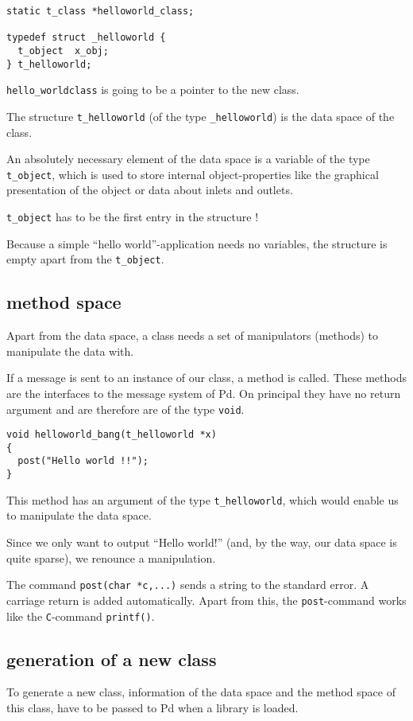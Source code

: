 \documentclass[12pt, a4paper,english,titlepage]{article}
\begin{document}
\begin{verbatim}
static t_class *helloworld_class;

typedef struct _helloworld {
  t_object  x_obj;
} t_helloworld;
\end{verbatim}

\verb+hello_worldclass+ is going to be a pointer to the new class.

The structure \verb+t_helloworld+ (of the type \verb+_helloworld+) is
the data space of the class.

An absolutely necessary element of the data space is a variable of the type
\verb+t_object+, which is used to store internal object-properties like
the graphical presentation of the object or data about inlets and outlets.

\verb+t_object+ has to be the first entry in the structure !

Because a simple ``hello world''-application needs no variables,
the structure is empty apart from the \verb+t_object+.


\subsection{method space}
Apart from the data space, a class needs a set of manipulators (methods) to
manipulate the data with.

If a message is sent to an instance of our class, a method is called.
These methods are the interfaces to the message system of Pd.
On principal they have no return argument and are therefore are of the
type \verb+void+.

\begin{verbatim}
void helloworld_bang(t_helloworld *x)
{
  post("Hello world !!");
}
\end{verbatim}


This method has an argument of the type \verb+t_helloworld+,
which would enable us to manipulate the data space.

Since we only want to output ``Hello world!''
(and, by the way, our data space is quite sparse),
we renounce a manipulation.

The command \verb+post(char *c,...)+ sends a string to the standard error.
A carriage return is added automatically.
Apart from this, the \verb+post+-command works like the {\tt C}-command \verb+printf()+.

\subsection{generation of a new class}
To generate a new class, information of the data space and the method space of this class,
have to be passed to Pd when a library is loaded.
\end{document}
